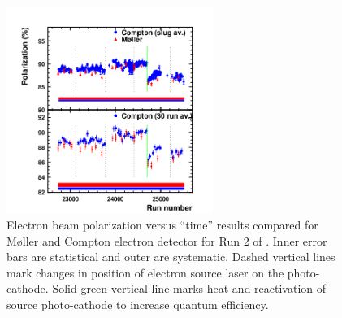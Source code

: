 \begin{figure}[ht]
\centering
\includegraphics[width=0.6\textwidth]{Pictures/run2_moller_compton.png}
\caption{Electron beam polarization versus ``time'' results compared for M\o ller and Compton electron detector for Run 2 of \Q. Inner error bars are statistical and outer are systematic. Dashed vertical lines mark changes in position of electron source laser on the photo-cathode. Solid green vertical line marks heat and reactivation of source photo-cathode to increase quantum efficiency.   }
\label{fig:Run2_edet_moller_pol}
\end{figure} 

